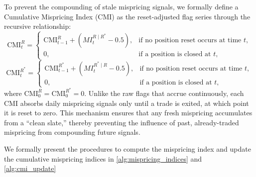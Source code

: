 To prevent the compounding of stale mispricing signals, we formally define a Cumulative Mispricing Index (CMI) as the reset-adjusted flag series through the recursive relationship:
$$
\mathrm{CMI}^{R}_{t} =
\begin{cases}
\mathrm{CMI}^{R}_{t-1} + (MI_t^{R\mid R^*} - 0.5), & \text{if no position reset occurs at time } t,\\
0, & \text{if a position is closed at } t,
\end{cases}
$$
$$
\mathrm{CMI}^{R^*}_{t} =
\begin{cases}
\mathrm{CMI}^{R^*}_{t-1} + (MI_t^{R^*\mid R} - 0.5), & \text{if no position reset occurs at time } t,\\
0, & \text{if a position is closed at } t,
\end{cases}
$$
where \(\mathrm{CMI}^R_{0}= \mathrm{CMI}^{R^*}_{0}=0\). 
Unlike the raw flags that accrue continuously, each CMI absorbs daily mispricing signals only until a trade is exited, at which point it is reset to zero. This mechanism ensures that any fresh mispricing accumulates from a ``clean slate,'' thereby preventing the influence of past, already-traded mispricing from compounding future signals.

We formally present the procedures to compute the mispricing index and update the cumulative mispricing indices in \cref{alg:mispricing_indices} and \cref{alg:cmi_update}

%
%
%




